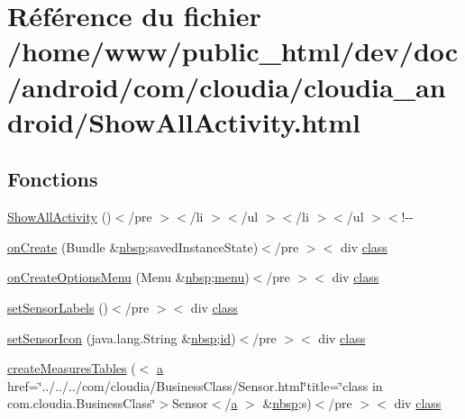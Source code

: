 \hypertarget{_show_all_activity_8html}{\section{Référence du fichier /home/www/public\-\_\-html/dev/doc/android/com/cloudia/cloudia\-\_\-android/\-Show\-All\-Activity.html}
\label{_show_all_activity_8html}
}
\subsection*{Fonctions}
\begin{DoxyCompactItemize}
\item 
\hyperlink{_show_all_activity_8html_a266ee4cdc9f55e7d49c1f3e0be637fc6}{Show\-All\-Activity} ()$<$/pre $>$$<$/li $>$$<$/ul $>$$<$/li $>$$<$/ul $>$$<$!-\/-\/
\item 
\hyperlink{_show_all_activity_8html_aba0a51a46194045c19fd67aa9ed0dd44}{on\-Create} (Bundle \&\hyperlink{_tools_8html_aef915316f784c9063d942974538301a6}{nbsp};saved\-Instance\-State)$<$/pre $>$$<$ div \hyperlink{_tools_8html_acf06f836132665ba8114f5a414c2403f}{class}
\item 
\hyperlink{_show_all_activity_8html_ad8d185357392942cfdc98d8a6f3e53d3}{on\-Create\-Options\-Menu} (Menu \&\hyperlink{_tools_8html_aef915316f784c9063d942974538301a6}{nbsp};\hyperlink{index-11_8html_a130970675bc563bd79bc2a7254add303}{menu})$<$/pre $>$$<$ div \hyperlink{_tools_8html_acf06f836132665ba8114f5a414c2403f}{class}
\item 
\hyperlink{_show_all_activity_8html_a9b8f626158fa38967d43b87c6e6460c3}{set\-Sensor\-Labels} ()$<$/pre $>$$<$ div \hyperlink{_tools_8html_acf06f836132665ba8114f5a414c2403f}{class}
\item 
\hyperlink{_show_all_activity_8html_aa4078d40e86af191850bb1255dd479f8}{set\-Sensor\-Icon} (java.\-lang.\-String \&\hyperlink{_tools_8html_aef915316f784c9063d942974538301a6}{nbsp};\hyperlink{index-9_8html_aa9b8ff1d03b739d1e752b9d9a5aa7c98}{id})$<$/pre $>$$<$ div \hyperlink{_tools_8html_acf06f836132665ba8114f5a414c2403f}{class}
\item 
\hyperlink{_show_all_activity_8html_a68d2d35e32311d3e1d81b1f4d9d268f1}{create\-Measures\-Tables} ($<$ \hyperlink{style_8css_a5e8981582017bb8b84c21f148345d1f7}{a} href=\char`\"{}../../../com/cloudia/Business\-Class/Sensor.\-html\char`\"{}title=\char`\"{}class in com.\-cloudia.\-Business\-Class\char`\"{}$>$Sensor$<$/\hyperlink{style_8css_a5e8981582017bb8b84c21f148345d1f7}{a} $>$ \&\hyperlink{_tools_8html_aef915316f784c9063d942974538301a6}{nbsp};s)$<$/pre $>$$<$ div \hyperlink{_tools_8html_acf06f836132665ba8114f5a414c2403f}{class}

\end{DoxyCompactItemize}
